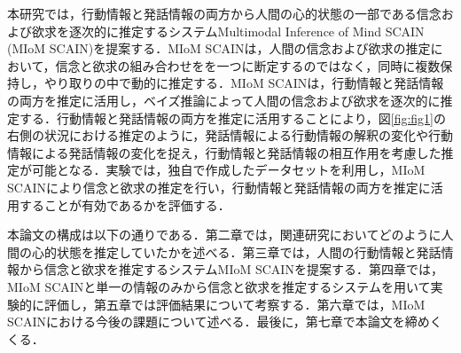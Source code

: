 
\par
本研究では，行動情報と発話情報の両方から人間の心的状態の一部である信念および欲求を逐次的に推定するシステムMultimodal Inference of Mind SCAIN (MIoM SCAIN)を提案する．MIoM SCAINは，人間の信念および欲求の推定において，信念と欲求の組み合わせをを一つに断定するのではなく，同時に複数保持し，やり取りの中で動的に推定する．MIoM SCAINは，行動情報と発話情報の両方を推定に活用し，ベイズ推論によって人間の信念および欲求を逐次的に推定する．行動情報と発話情報の両方を推定に活用することにより，図\ref{fig:fig1}の右側の状況における推定のように，発話情報による行動情報の解釈の変化や行動情報による発話情報の変化を捉え，行動情報と発話情報の相互作用を考慮した推定が可能となる．実験では，独自で作成したデータセットを利用し，MIoM SCAINにより信念と欲求の推定を行い，行動情報と発話情報の両方を推定に活用することが有効であるかを評価する．

\par
本論文の構成は以下の通りである．第二章では，関連研究においてどのように人間の心的状態を推定していたかを述べる．第三章では，人間の行動情報と発話情報から信念と欲求を推定するシステムMIoM SCAINを提案する．第四章では，MIoM SCAINと単一の情報のみから信念と欲求を推定するシステムを用いて実験的に評価し，第五章では評価結果について考察する．第六章では，MIoM SCAINにおける今後の課題について述べる．最後に，第七章で本論文を締めくくる．
